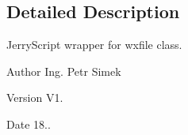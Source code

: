 \subsection{Detailed Description}
Jerry\+Script wrapper for wxfile class. 

\begin{DoxyAuthor}{Author}
Ing. Petr Simek 
\end{DoxyAuthor}
\begin{DoxyVersion}{Version}
V1. 
\end{DoxyVersion}
\begin{DoxyDate}{Date}
18.. 
\end{DoxyDate}

